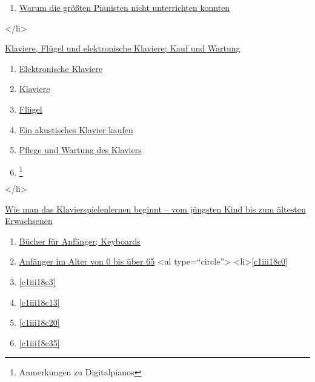 {\begin{enumerate}[label={\alph*.}]
   \item \hyperref[c1iii16e]{Warum die größten Pianisten nicht unterrichten konnten}
   \end{enumerate}
 </li>
 \item \hyperref[c1iii17]{Klaviere, Flügel und elektronische Klaviere; Kauf und Wartung}
  \begin{enumerate}[label={\alph*.}] 
   <li>\hyperref[c1iii17a]{Flügel, akustisches oder elektronisches Klavier?}
   \item \hyperref[c1iii17b]{Elektronische Klaviere}
   \item \hyperref[c1iii17c]{Klaviere}
   \item \hyperref[c1iii17d]{Flügel}
   \item \hyperref[c1iii17e]{Ein akustisches Klavier kaufen}
   \item \hyperref[c1iii17f]{Pflege und Wartung des Klaviers}
   \item \hyperref[c1iii17g]{\footnote{Anmerkungen zu Digitalpianos}}
   \end{enumerate}
 </li>
 \item \hyperref[c1iii18]{Wie man das Klavierspielenlernen beginnt -- vom jüngsten Kind bis zum ältesten Erwachsenen}
     \begin{enumerate}[label={\alph*.}] 
        <li>\hyperref[c1iii18a]{Benötigt man einen Lehrer?}
        \item \hyperref[c1iii18b]{Bücher für Anfänger; Keyboards}
        \item \hyperref[c1iii18c]{Anfänger im Alter von 0 bis über 65}
            <ul type=\enquote{circle}>
               <li>\hyperref[c1iii18c0]{\autoref{c1iii18c0}}
               \item \hyperref[c1iii18c3]{\autoref{c1iii18c3}}
               \item \hyperref[c1iii18c13]{\autoref{c1iii18c13}}
               \item \hyperref[c1iii18c20]{\autoref{c1iii18c20}}
               \item \hyperref[c1iii18c35]{\autoref{c1iii18c35}}

\end{enumerate}}
